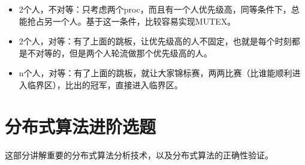 \documentclass[UTF8]{ctexrep}
\begin{document}
\begin{itemize}
    \item 2个人，不对等：只考虑两个proc，而且有一个人优先级高，同等条件下，总能抢占另一个人。基于这一条件，比较容易实现MUTEX。
    
    \item 2个人，对等：有了上面的跳板，让优先级高的人不固定，也就是每个时刻都是不对等的，但是两个人轮流做那个优先级高的人。
    
    \item n个人，对等：有了上面的跳板，就让大家锦标赛，两两比赛（比谁能顺利进入临界区），比出的冠军，直接进入临界区。
\end{itemize}


\part{分布式算法进阶选题}

这部分讲解重要的分布式算法分析技术，以及分布式算法的正确性验证。







\appendix

%
%
%    
%    
\end{document}
